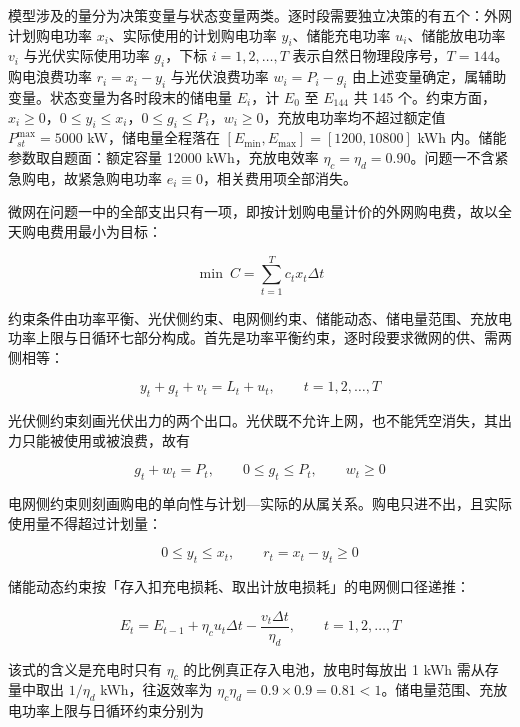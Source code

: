 \documentclass[12pt,a4paper]{ctexart}
\begin{document}
模型涉及的量分为决策变量与状态变量两类。逐时段需要独立决策的有五个：外网计划购电功率 $x_i$、实际使用的计划购电功率 $y_i$、储能充电功率 $u_i$、储能放电功率 $v_i$ 与光伏实际使用功率 $g_i$，下标 $i=1,2,\dots,T$ 表示自然日物理段序号，$T=144$。购电浪费功率 $r_i=x_i-y_i$ 与光伏浪费功率 $w_i=P_i-g_i$ 由上述变量确定，属辅助变量。状态变量为各时段末的储电量 $E_i$，计 $E_0$ 至 $E_{144}$ 共 145 个。约束方面，$x_i\ge0$，$0\le y_i\le x_i$，$0\le g_i\le P_i$，$w_i\ge0$，充放电功率均不超过额定值 $P_{st}^{\max}=5000$ kW，储电量全程落在 $[E_{\min},E_{\max}]=[1200,10800]$ kWh 内。储能参数取自题面：额定容量 12000 kWh，充放电效率 $\eta_c=\eta_d=0.90$。问题一不含紧急购电，故紧急购电功率 $e_i\equiv0$，相关费用项全部消失。

微网在问题一中的全部支出只有一项，即按计划购电量计价的外网购电费，故以全天购电费用最小为目标：

\begin{equation}
\min\ C=\sum_{t=1}^{T} c_t x_t \Delta t
\end{equation}

约束条件由功率平衡、光伏侧约束、电网侧约束、储能动态、储电量范围、充放电功率上限与日循环七部分构成。首先是功率平衡约束，逐时段要求微网的供、需两侧相等：

\begin{equation}
y_t+g_t+v_t=L_t+u_t,\qquad t=1,2,\dots,T
\end{equation}

光伏侧约束刻画光伏出力的两个出口。光伏既不允许上网，也不能凭空消失，其出力只能被使用或被浪费，故有

\begin{equation}
g_t+w_t=P_t,\qquad 0\le g_t\le P_t,\qquad w_t\ge0
\end{equation}

电网侧约束则刻画购电的单向性与计划—实际的从属关系。购电只进不出，且实际使用量不得超过计划量：

\begin{equation}
0\le y_t\le x_t,\qquad r_t=x_t-y_t\ge0
\end{equation}

储能动态约束按「存入扣充电损耗、取出计放电损耗」的电网侧口径递推：

\begin{equation}
E_t=E_{t-1}+\eta_c u_t \Delta t-\frac{v_t \Delta t}{\eta_d},\qquad t=1,2,\dots,T
\end{equation}

该式的含义是充电时只有 $\eta_c$ 的比例真正存入电池，放电时每放出 1 kWh 需从存量中取出 $1/\eta_d$ kWh，往返效率为 $\eta_c\eta_d=0.9\times0.9=0.81<1$。储电量范围、充放电功率上限与日循环约束分别为
\end{document}

